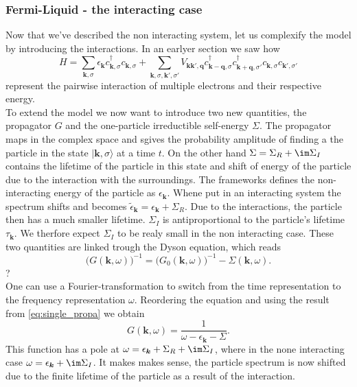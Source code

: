 \documentclass[../main.tex]{subfile}
\begin{document}
\subsubsection{Fermi-Liquid - the interacting case}
Now that we've described the non interacting system, let us complexify the model by introducing the interactions.
In an earlyer section we saw how
\begin{equation} \label{eq:FermiLiquid_Hamiltonian}
    H = \sum_{\bm{k},\sigma} \epsilon_{\bm{k}} c_{\bm{k},\sigma}^{\dagger}c_{\bm{k},\sigma} + \sum_{\bm{k},\sigma,\bm{k}',\sigma'}
        V_{\bm{k}\bm{k}', \bm{q}} c_{\bm{k}-\bm{q},\sigma}^{\dagger}c_{\bm{k}+\bm{q},\sigma'}^{\dagger}c_{\bm{k},\sigma}c_{\bm{k}',\sigma'}
\end{equation}
represent the pairwise interaction of multiple electrons and their respective energy.\\

To extend the model we now want to introduce two new quantities,
the propagator $G$ and the one-particle irreductible self-energy $\Sigma$.
The propagator maps in the complex space and sgives the probability amplitude of finding a the particle in the state $|\bm{k},\sigma\rangle$ at a time $t$. On the other hand 
$\Sigma = \Sigma_R + \im \Sigma_I$ contains 
the lifetime of the particle in this state and shift of energy of the particle due to the interaction with the surroundings. The frameworks defines the 
non-interacting energy of the particle as $\epsilon_{\bm{k}}$. Whene put in an interacting system the spectrum shifts and becomes 
$\tilde{\epsilon}_{\bm{k}} =  \epsilon_{\bm{k}} + \Sigma_R$. Due to the interactions, the particle then has a much smaller lifetime. $\Sigma_I$ is antiproportional to 
the particle's lifetime $\tau_{\bm{k}}$. We therfore expect $\Sigma_I$ to be realy small in the non interacting case. 
These two quantities are linked trough the Dyson equation, which reads
\[
    \bigl(G(\bm{k}, \omega)\bigr)^{-1} =  \bigl(G_0(\bm{k}, \omega)\bigr)^{-1} - \Sigma(\bm{k},\omega).
\]
?\\

One can use a Fourier-transformation to switch from the time representation to the frequency representation $\omega$. Reordering the equation and using the result
from \ref{eq:single_propa} we obtain
\[
    G(\bm{k},\omega) = \frac{1}{\omega - \epsilon_{\bm{k}} - \Sigma}.
\]
This function has a pole at $\omega = \epsilon_{\bm{k}} + \Sigma_R + \im \Sigma_I$, where in the none interacting case $\omega = \epsilon_{\bm{k}} + \im\Sigma_I$.
It makes makes sense, the particle spectrum is now shifted due to the finite lifetime of the particle as a result of the interaction.\\
\end{document}
